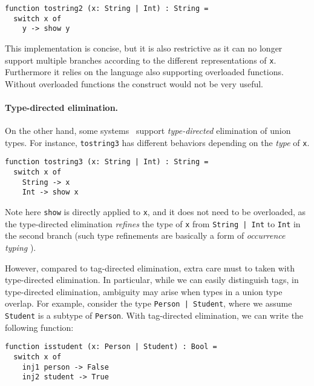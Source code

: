 \begin{lstlisting}
function tostring2 (x: String | Int) : String =
  switch x of
    y -> show y
\end{lstlisting}

This implementation is concise, but it is also restrictive as it can no longer
support multiple branches according to the different representations of
\lstinline{x}. Furthermore it relies on the language also supporting overloaded
functions. Without overloaded functions the construct would not be very useful.

\paragraph{Type-directed elimination.}

On the other hand, some
systems~\cite{castagna:settheoretic,muehlboeck2018empowering} support
\textit{type-directed} elimination of union types. For instance,
\lstinline{tostring3} has different behaviors depending on the \textit{type} of
\lstinline{x}.

\begin{lstlisting}
function tostring3 (x: String | Int) : String =
  switch x of
    String -> x
    Int -> show x
\end{lstlisting}

\noindent Note here \lstinline{show} is directly applied to \lstinline{x}, and
it does not need to be overloaded, as the type-directed elimination
\textit{refines} the type of \lstinline{x} from \lstinline{String | Int} to
\lstinline{Int} in the second branch (such type refinements are basically a form of
\textit{occurrence typing} \cite{Tobin:typedscheme}).

However, compared to tag-directed elimination, extra care must to taken with
type-directed elimination. In particular, while we can easily distinguish tags,
in type-directed elimination, ambiguity may arise when types in a union type
overlap. For example, consider the type \lstinline{Person | Student}, where we
assume \lstinline{Student} is a subtype of \lstinline{Person}. With tag-directed
elimination, we can write the following function:

\begin{lstlisting}
function isstudent (x: Person | Student) : Bool =
  switch x of
    inj1 person -> False
    inj2 student -> True
\end{lstlisting}

